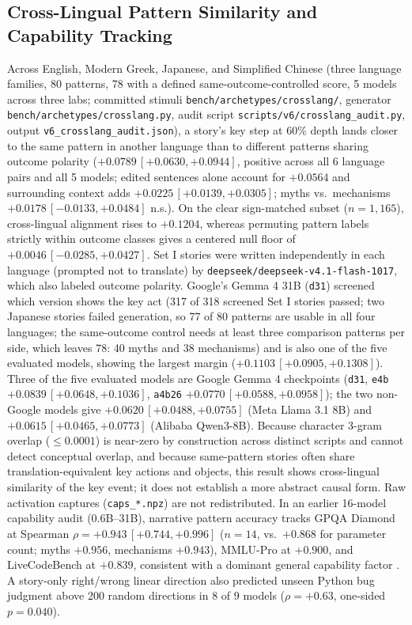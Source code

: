 \documentclass[conference]{IEEEtran}
\begin{document}
\subsection{Cross-Lingual Pattern Similarity and Capability Tracking}
\label{sec:xling}
Across English, Modern Greek, Japanese, and Simplified Chinese (three language families, 80 patterns, 78 with a defined same-outcome-controlled score, 5 models across three labs; committed stimuli \texttt{bench/archetypes/crosslang/}, generator \texttt{bench/archetypes/crosslang.py}, audit script \texttt{scripts/v6/crosslang\_audit.py}, output \texttt{v6\_crosslang\_audit.json}), a story's key step at 60\% depth lands closer to the same pattern in another language than to different patterns sharing outcome polarity ($+0.0789\,[+0.0630,+0.0944]$, positive across all 6 language pairs and all 5 models; edited sentences alone account for $+0.0564$ and surrounding context adds $+0.0225\,[+0.0139,+0.0305]$; myths vs.\ mechanisms $+0.0178\,[-0.0133,+0.0484]$ n.s.). On the clear sign-matched subset ($n=1,165$), cross-lingual alignment rises to $+0.1204$, whereas permuting pattern labels strictly within outcome classes gives a centered null floor of $+0.0046\,[-0.0285,+0.0427]$. Set I stories were written independently in each language (prompted not to translate) by \texttt{deepseek/deepseek-v4.1-flash-1017}, which also labeled outcome polarity. Google's Gemma 4 31B (\texttt{d31}) screened which version shows the key act (317 of 318 screened Set I stories passed; two Japanese stories failed generation, so 77 of 80 patterns are usable in all four languages; the same-outcome control needs at least three comparison patterns per side, which leaves 78: 40 myths and 38 mechanisms) and is also one of the five evaluated models, showing the largest margin ($+0.1103\,[+0.0905,+0.1308]$). Three of the five evaluated models are Google Gemma 4 checkpoints (\texttt{d31}, \texttt{e4b} $+0.0839\,[+0.0648,+0.1036]$, \texttt{a4b26} $+0.0770\,[+0.0588,+0.0958]$); the two non-Google models give $+0.0620\,[+0.0488,+0.0755]$ (Meta Llama 3.1 8B) and $+0.0615\,[+0.0465,+0.0773]$ (Alibaba Qwen3-8B). Because character 3-gram overlap ($\le 0.0001$) is near-zero by construction across distinct scripts and cannot detect conceptual overlap, and because same-pattern stories often share translation-equivalent key actions and objects, this result shows cross-lingual similarity of the key event; it does not establish a more abstract causal form. Raw activation captures (\texttt{caps\_*.npz}) are not redistributed. In an earlier 16-model capability audit (0.6B--31B), narrative pattern accuracy tracks GPQA Diamond \cite{rein2024gpqa,artificialanalysis2026evals} at Spearman $\rho=+0.943\,[+0.744,+0.996]$ ($n=14$, vs.\ $+0.868$ for parameter count; myths $+0.956$, mechanisms $+0.943$), MMLU-Pro at $+0.900$, and LiveCodeBench at $+0.839$, consistent with a dominant general capability factor \cite{ilic2023evidence}. A story-only right/wrong linear direction also predicted unseen Python bug judgment above 200 random directions in 8 of 9 models ($\rho=+0.63$, one-sided $p=0.040$).
\end{document}
